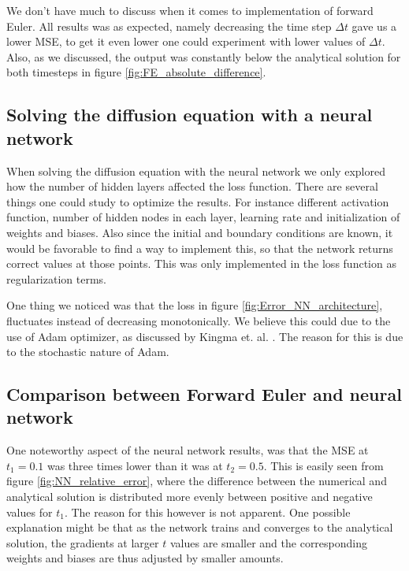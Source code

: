 \documentclass[12pt]{extarticle}
\begin{document}
We don't have much to discuss when it comes to implementation of forward Euler. All results was as expected, namely decreasing the time step $\Delta t$ gave us a lower MSE, to get it even lower one could experiment with lower values of $\Delta t$. Also, as we discussed, the output was constantly below the analytical solution for both timesteps in figure \ref{fig:FE_absolute_difference}.

\subsection{Solving the diffusion equation with a neural network}

When solving the diffusion equation with the neural network we only explored how the number of hidden layers affected the loss function. There are several things one could study to optimize the results. For instance different activation function, number of hidden nodes in each layer, learning rate and initialization of weights and biases. Also since the initial and boundary conditions are known, it would be favorable to find a way to implement this, so that the network returns correct values at those points. This was only implemented in the loss function as regularization terms. 

One thing we noticed was that the loss in figure \ref{fig:Error_NN_architecture}, fluctuates instead of decreasing monotonically. We believe this could due to the use of Adam optimizer, as discussed by Kingma et. al. \cite{kingma2017adam}. The reason for this is due to the stochastic nature of Adam.

\subsection{Comparison between Forward Euler and neural network}

One noteworthy aspect of the neural network results, was that the MSE at $t_1=0.1$ was three times lower than it was at $t_2=0.5$. This is easily seen from figure \ref{fig:NN_relative_error}, where the difference between the numerical and analytical solution is distributed more evenly between positive and negative values for $t_1$. The reason for this however is not apparent. One possible explanation might be that as the network trains and converges to the analytical solution, the gradients at larger $t$ values are smaller and the corresponding weights and biases are thus adjusted by smaller amounts.     
\end{document}
